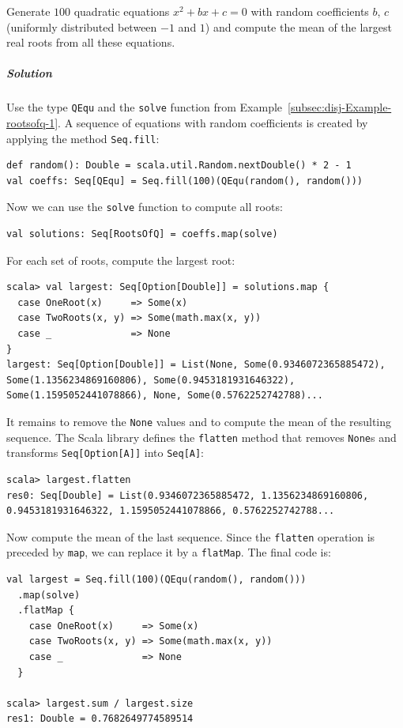 Generate $100$ quadratic equations $x^{2}+bx+c=0$ with random coefficients
$b$, $c$ (uniformly distributed between $-1$ and $1$) and compute
the mean of the largest real roots from all these equations.

\subparagraph{Solution}

Use the type \lstinline!QEqu! and the \lstinline!solve! function
from Example~\ref{subsec:disj-Example-rootsofq-1}. A sequence of
equations with random coefficients is created by applying the method
\lstinline!Seq.fill!:
\begin{lstlisting}
def random(): Double = scala.util.Random.nextDouble() * 2 - 1
val coeffs: Seq[QEqu] = Seq.fill(100)(QEqu(random(), random()))
\end{lstlisting}
Now we can use the \lstinline!solve! function to compute all roots:
\begin{lstlisting}
val solutions: Seq[RootsOfQ] = coeffs.map(solve)
\end{lstlisting}
For each set of roots, compute the largest root:
\begin{lstlisting}
scala> val largest: Seq[Option[Double]] = solutions.map {
  case OneRoot(x)     => Some(x)
  case TwoRoots(x, y) => Some(math.max(x, y))
  case _              => None
}
largest: Seq[Option[Double]] = List(None, Some(0.9346072365885472), Some(1.1356234869160806), Some(0.9453181931646322), Some(1.1595052441078866), None, Some(0.5762252742788)...
\end{lstlisting}
It remains to remove the \lstinline!None! values and to compute the
mean of the resulting sequence. The Scala library defines the \lstinline!flatten!
method that removes \lstinline!None!s and transforms \lstinline!Seq[Option[A]]!
into \lstinline!Seq[A]!:
\begin{lstlisting}
scala> largest.flatten
res0: Seq[Double] = List(0.9346072365885472, 1.1356234869160806, 0.9453181931646322, 1.1595052441078866, 0.5762252742788...
\end{lstlisting}
Now compute the mean of the last sequence. Since the \lstinline!flatten!
operation is preceded by \lstinline!map!, we can replace it by a
\lstinline!flatMap!. The final code is:
\begin{lstlisting}
val largest = Seq.fill(100)(QEqu(random(), random()))
  .map(solve)
  .flatMap {
    case OneRoot(x)     => Some(x)
    case TwoRoots(x, y) => Some(math.max(x, y))
    case _              => None
  }

scala> largest.sum / largest.size
res1: Double = 0.7682649774589514
\end{lstlisting}


